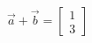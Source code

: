 \documentclass[preview]{standalone}
\begin{document}
\begin{align*}
\vec{a}+\vec{b}=\begin{bmatrix}1\\3\end{bmatrix}
\end{align*}
\end{document}
